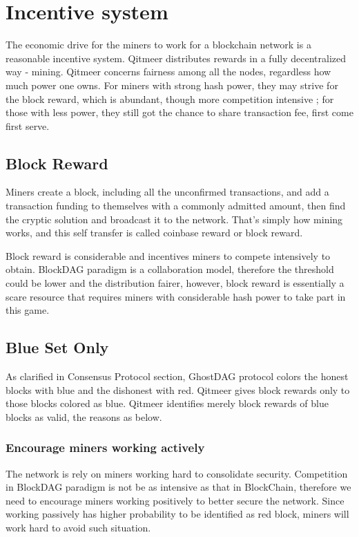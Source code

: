 \documentclass[a4paper,11pt]{article}
\begin{document}
\section{Incentive system}
The economic drive for the miners to work for a blockchain network is a reasonable incentive system. Qitmeer distributes rewards in a fully decentralized way - mining. Qitmeer concerns fairness among all the nodes, regardless how much power one owns. For miners with strong hash power, they may strive for the block reward, which is abundant, though more competition intensive ; for those with less power, they still got the chance to share transaction fee, first come first serve.

\subsection{Block Reward}
Miners create a block, including all the unconfirmed transactions, and add a transaction funding to themselves with a commonly admitted amount, then find the cryptic solution and broadcast it to the network. That's simply how mining works, and  this self transfer is called coinbase reward or block reward. 

Block reward is considerable and incentives miners to compete intensively to obtain.  BlockDAG paradigm is a collaboration model, therefore the threshold could be lower and the distribution  fairer, however, block reward is essentially a scare resource that requires miners with considerable hash power to take part in this game.

\subsection*{Blue Set Only}
As clarified in Consensus Protocol section, GhostDAG protocol colors the honest blocks with blue and the dishonest with red. Qitmeer gives block rewards only to those blocks colored as blue.
Qitmeer identifies merely block rewards of blue blocks as valid, the reasons as below.

\subsubsection*{Encourage miners working actively}
The network is rely on miners working hard to consolidate security. Competition in BlockDAG paradigm is not be as intensive as that in BlockChain, therefore we need to encourage miners working positively to better secure the network. Since working passively has higher probability to be identified as red block, miners will work hard to avoid such situation.
\end{document}
